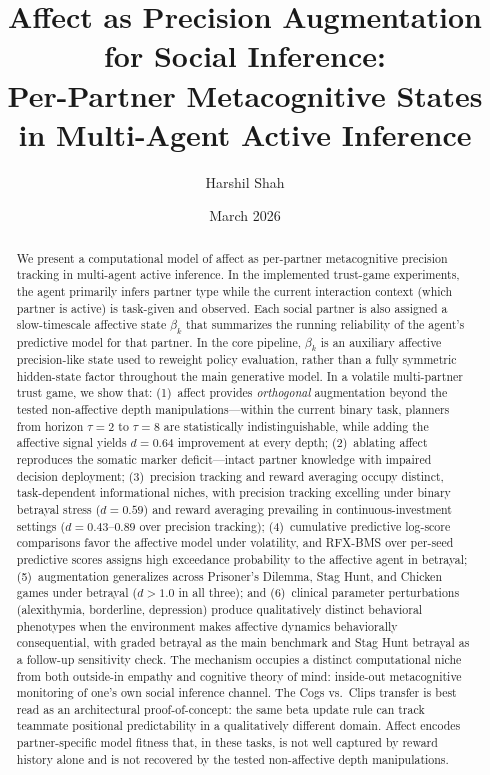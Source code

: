 \documentclass[11pt,a4paper]{article}
\title{%
  Affect as Precision Augmentation for Social Inference:\\
  Per-Partner Metacognitive States in Multi-Agent Active Inference%
}
\author[1]{Harshil Shah}
\affil[1]{Independent Researcher}
\date{March 2026}
\begin{document}
\maketitle

\begin{abstract}
We present a computational model of affect as per-partner metacognitive precision tracking in multi-agent active inference. In the implemented trust-game experiments, the agent primarily infers partner type while the current interaction context (which partner is active) is task-given and observed. Each social partner is also assigned a slow-timescale affective state $\beta_k$ that summarizes the running reliability of the agent's predictive model for that partner. In the core pipeline, $\beta_k$ is an auxiliary affective precision-like state used to reweight policy evaluation, rather than a fully symmetric hidden-state factor throughout the main generative model. In a volatile multi-partner trust game, we show that: (1)~affect provides \emph{orthogonal} augmentation beyond the tested non-affective depth manipulations---within the current binary task, planners from horizon $\tau = 2$ to $\tau = 8$ are statistically indistinguishable, while adding the affective signal yields $d = 0.64$ improvement at every depth; (2)~ablating affect reproduces the somatic marker deficit---intact partner knowledge with impaired decision deployment; (3)~precision tracking and reward averaging occupy distinct, task-dependent informational niches, with precision tracking excelling under binary betrayal stress ($d = 0.59$) and reward averaging prevailing in continuous-investment settings ($d = 0.43$--$0.89$ over precision tracking); (4)~cumulative predictive log-score comparisons favor the affective model under volatility, and RFX-BMS over per-seed predictive scores assigns high exceedance probability to the affective agent in betrayal; (5)~augmentation generalizes across Prisoner's Dilemma, Stag Hunt, and Chicken games under betrayal ($d > 1.0$ in all three); and (6)~clinical parameter perturbations (alexithymia, borderline, depression) produce qualitatively distinct behavioral phenotypes when the environment makes affective dynamics behaviorally consequential, with graded betrayal as the main benchmark and Stag Hunt betrayal as a follow-up sensitivity check. The mechanism occupies a distinct computational niche from both outside-in empathy and cognitive theory of mind: inside-out metacognitive monitoring of one's own social inference channel. The Cogs vs.\ Clips transfer is best read as an architectural proof-of-concept: the same beta update rule can track teammate positional predictability in a qualitatively different domain. Affect encodes partner-specific model fitness that, in these tasks, is not well captured by reward history alone and is not recovered by the tested non-affective depth manipulations.
\end{abstract}
\end{document}
